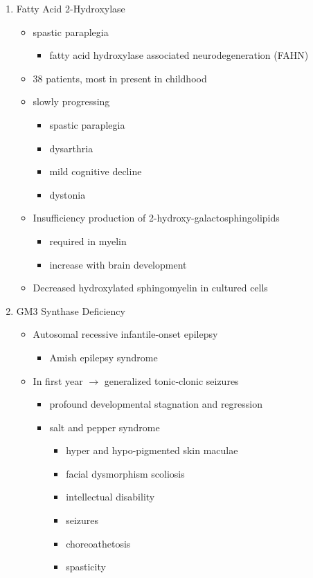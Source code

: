 \documentclass{scrartcl}
\begin{document}
\begin{enumerate}
\item Fatty Acid 2-Hydroxylase
\label{sec:orgef46549}

\begin{itemize}
\item spastic paraplegia
\begin{itemize}
\item fatty acid hydroxylase associated neurodegeneration (FAHN)
\end{itemize}
\item 38 patients, most in present in childhood
\item slowly progressing
\begin{itemize}
\item spastic paraplegia
\item dysarthria
\item mild cognitive decline
\item dystonia
\end{itemize}

\item Insufficiency production of 2-hydroxy-galactosphingolipids
\begin{itemize}
\item required in myelin
\item increase with brain development
\end{itemize}

\item Decreased hydroxylated sphingomyelin in cultured cells
\end{itemize}

\item GM3 Synthase Deficiency
\label{sec:org0d6ec20}

\begin{itemize}
\item Autosomal recessive infantile-onset epilepsy
\begin{itemize}
\item Amish epilepsy syndrome
\end{itemize}
\item In first year \(\to\) generalized tonic-clonic seizures
\begin{itemize}
\item profound developmental stagnation and regression
\item salt and pepper syndrome
\begin{itemize}
\item hyper and hypo-pigmented skin maculae
\item facial dysmorphism scoliosis
\item intellectual disability
\item seizures
\item choreoathetosis
\item spasticity
\end{itemize}
\end{itemize}


\end{itemize}
\end{enumerate}
\end{document}
